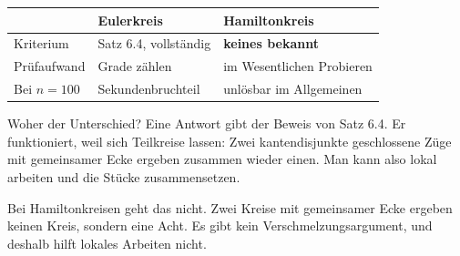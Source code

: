 \begin{warnung}
\begin{center}
{\small
\renewcommand{\arraystretch}{1.5}
\begin{tabular}{@{}P{2.4cm}P{2.9cm}P{2.9cm}@{}}
\toprule
& \textbf{Eulerkreis} & \textbf{Hamiltonkreis}\\
\midrule
Kriterium & \textcolor{gruen}{Satz 6.4, vollständig} & \textcolor{akzent}{\textbf{keines bekannt}}\\
Prüfaufwand & \textcolor{gruen}{Grade zählen} & \textcolor{akzent}{im Wesentlichen Probieren}\\
Bei $n = 100$ & \textcolor{gruen}{Sekundenbruchteil} & \textcolor{akzent}{unlösbar im Allgemeinen}\\
\bottomrule
\end{tabular}}
\end{center}

Woher der Unterschied? Eine Antwort gibt der Beweis von Satz 6.4. Er funktioniert, weil sich Teilkreise  lassen: Zwei kantendisjunkte geschlossene Züge mit gemeinsamer Ecke ergeben zusammen wieder einen. Man kann also lokal arbeiten und die Stücke zusammensetzen.

Bei Hamiltonkreisen geht das nicht. Zwei Kreise mit gemeinsamer Ecke ergeben keinen Kreis, sondern eine Acht. Es gibt kein Verschmelzungsargument, und deshalb hilft lokales Arbeiten nicht.

\begin{center}
\end{center}

\begin{center}
\begin{minipage}{0.88\textwidth}
\end{minipage}
\end{center}
\end{warnung}

